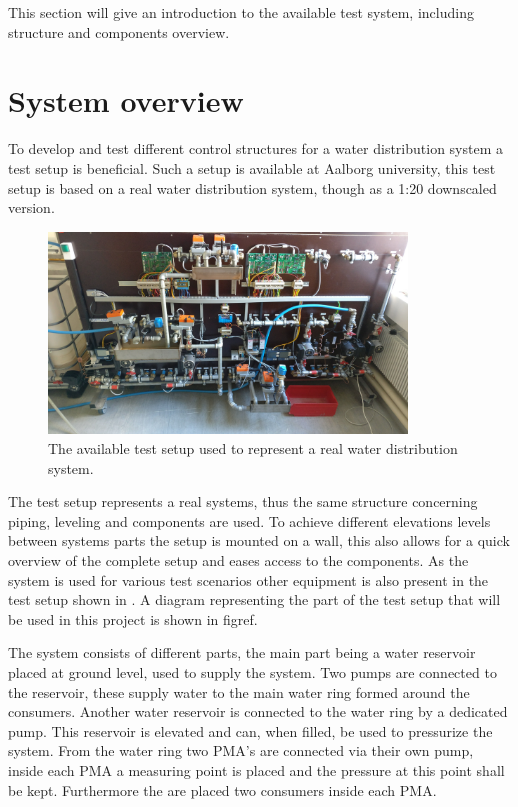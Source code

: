 This section will give an introduction to the available test system, including structure and components overview.  

\section{System overview}
\label{system_overview}
To develop and test different control structures for a water distribution system a test setup is beneficial.
Such a setup is available at Aalborg university, this test setup is based on a real water distribution system, though as a 1:20 downscaled version.

\begin{figure}[H]
\centering
\includegraphics[width=0.85\textwidth]{report/pictures/test_system_wide}
\caption{The available test setup used to represent a real water distribution system.}
\label{fig:test_setup}
\end{figure}


The test setup represents a real systems, thus the same structure concerning piping, leveling and components are used. To achieve different elevations levels between systems parts the setup is mounted on a wall, this also allows for a quick overview of the complete setup and eases access to the components. As the system is used for various test scenarios other equipment is also present in the test setup shown in . A diagram representing the part of the test setup that will be used in this project is shown in figref. 



The system consists of different parts, the main part being a water reservoir placed at ground level, used to supply the system. Two pumps are connected to the reservoir, these supply water to the main water ring formed around the consumers. 
Another water reservoir is connected to the water ring by a dedicated pump. This reservoir is elevated and can, when filled, be used to pressurize the system. 
From the water ring two PMA's are connected via their own pump, inside each PMA a measuring point is placed and the pressure at this point shall be kept. Furthermore the are placed two consumers inside each PMA.         

